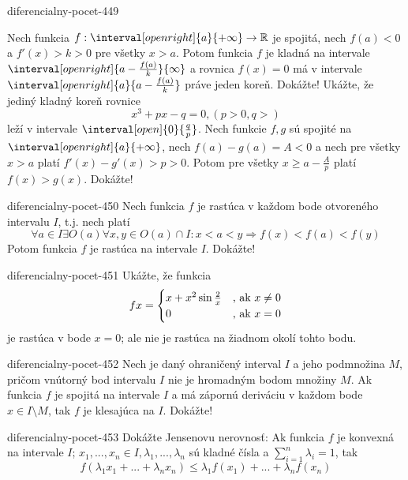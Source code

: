 \begin{defproblem}{diferencialny-pocet-449}
\begin{tasks}
\task
  Nech funkcia $f:\interval[open right]{a}{+\infty} \rightarrow \mathbb{R}$ je
  spojitá, nech $f(a)<0$ a $f'(x)>k>0$ pre všetky $x>a$. Potom funkcia $f$ je
  kladná na intervale $\interval[open right]{a-\frac{f(a)}{k}}{\infty}$ a
  rovnica $f(x)=0$ má v intervale $\interval[open right]{a}{a-\frac{f(a)}{k}}$
  práve jeden koreň. Dokážte!
\task
  Ukážte, že jediný kladný koreň rovnice
  \[
    x^3+px-q=0,(p>0,q>)
  \]
  leží v intervale $\interval[open]{0}{\frac{q}{p}}$.
\task
  Nech funkcie $f,g$ sú spojité na $\interval[open right]{a}{+\infty}$, nech
  $f(a)-g(a)=A<0$ a nech pre všetky $x>a$ platí $f'(x)-g'(x)>p>0$. Potom pre
  všetky $x \geq a-\frac{A}{p}$ platí $f(x)>g(x)$. Dokážte!
\end{tasks}
\end{defproblem}

\begin{defproblem}{diferencialny-pocet-450}
Nech funkcia $f$ je rastúca v každom bode otvoreného intervalu $I$, t.j. nech
platí
\[
  \forall a\in I \exists O(a) \forall x,y\in O(a)\cap I:
    x<a<y \Rightarrow f(x)<f(a)<f(y)
\]
Potom funkcia $f$ je rastúca na intervale $I$. Dokážte!
\end{defproblem}

\begin{defproblem}{diferencialny-pocet-451}
Ukážte, že funkcia
\[
  f{x}=
  \begin{cases}
    x+x^2\sin \frac{2}{x} & $, ak $ x \neq 0 \\
    0 &  $, ak $ x=0
  \end{cases}
\]
je rastúca v bode $x=0$; ale nie je rastúca na žiadnom okolí tohto bodu.
\end{defproblem}

\begin{defproblem}{diferencialny-pocet-452}
Nech je daný ohraničený interval $I$ a jeho podmnožina $M$, pričom vnútorný bod
intervalu $I$ nie je hromadným bodom množiny $M$. Ak funkcia $f$ je spojitá na
intervale $I$ a má zápornú deriváciu v každom bode $x\in I\setminus M$, tak $f$
je klesajúca na $I$. Dokážte!
\end{defproblem}

\begin{defproblem}{diferencialny-pocet-453}
Dokážte Jensenovu nerovnosť: Ak funkcia $f$ je konvexná na intervale $I$;
$x_1,...,x_n\in I,\lambda_1,...,\lambda_n$ sú kladné čísla a $\sum_{i=1}^n
\lambda_i=1$, tak
\[
  f(\lambda_1x_1+...+\lambda_nx_n)\leq \lambda_1f(x_1)+...+\lambda_nf(x_n)
\]
\end{defproblem}

